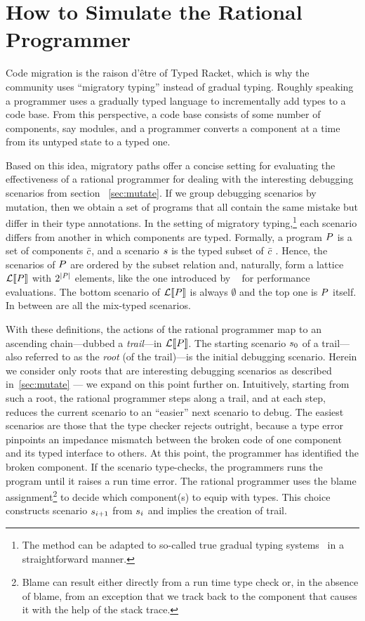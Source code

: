 \section{How to Simulate the Rational Programmer} 

Code migration is the raison d'\^etre of Typed Racket, which is why the community
uses ``migratory typing'' instead of gradual typing. Roughly speaking a
programmer uses a gradually typed language to incrementally add types to a code
base. From this perspective, a code base consists of some number of components,
say modules, and a programmer converts a component at a time from its untyped
state to a typed one. 

Based on this idea, migratory paths offer a concise setting for
evaluating the effectiveness of a rational programmer for dealing with the
interesting debugging scenarios  from section ~\ref{sec:mutate}.
If we group debugging scenarios by mutation, then we obtain a set 
of programs that all contain the same mistake but differ in their type
annotations.  In the setting of migratory typing,\footnote{The method can be adapted to
so-called true gradual typing systems~\cite{svcb-snapl-2015} in a
straightforward manner.} each scenario differs from another in which
components are typed. Formally, a program $P$ is a set of
components $\bar{c}$, and a scenario $s$ is the typed subset of
$\bar{c}$ . Hence, the scenarios of $P$ are ordered by the
subset relation and, naturally,  form a lattice $\mathcal{L}\llbracket P\rrbracket$ with
$2^{\mid P \mid}$ elements, like
the one introduced by ~\citet{tfgnvf-popl-2016} for performance
evaluations. The bottom scenario of
$\mathcal{L}\llbracket P\rrbracket$ is always $\emptyset$ and the top one is $P$
itself. In between are all the mix-typed scenarios.


With these definitions, the actions of the rational programmer map to an
ascending chain---dubbed a \emph{trail}---in $\mathcal{L}\llbracket P\rrbracket$.  The
starting scenario $s_0$ of a trail---also referred to as the
\emph{root} (of the trail)---is the initial debugging scenario.  Herein we
consider only roots that are interesting debugging scenarios as described
in~\ref{sec:mutate} --- we expand on this point further on.  Intuitively,
starting from such a root, the rational programmer  steps along a trail,
and at each step, reduces the current scenario to an ``easier'' next
scenario to debug.  The easiest scenarios are those that the type checker
rejects outright, because a type error pinpoints an impedance mismatch
between the broken code of one component and its typed interface to
others. At this point, the programmer has identified the broken component.
If the scenario type-checks, the programmers runs the program until it
raises a run time error.  The rational programmer uses the blame
assignment\footnote{Blame can result either directly from a run time type
check or, in the absence of blame, from an exception that we track back to
the component that causes it with the help of the stack trace.} to decide
which component(s) to equip with types. This choice constructs scenario
$s_{i+1}$ from $s_{i}$ and implies the creation of trail.  

